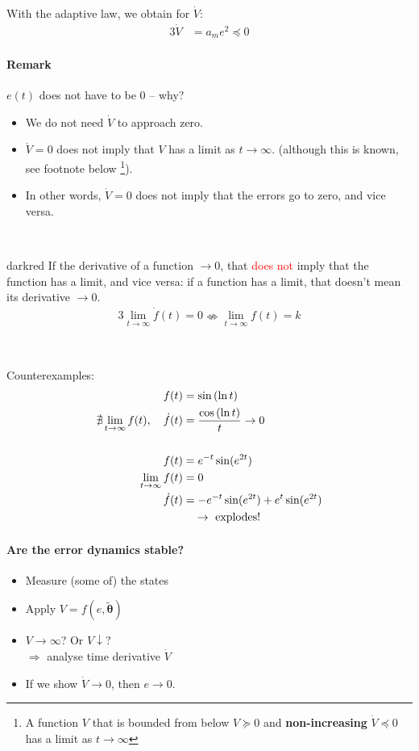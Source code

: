 With the adaptive law, we obtain for $\dot{V}$:
\begin{alignat}{3}
\dot{V} &= a_m e^2 \preceq 0 \label{eq:Vdot}
\end{alignat}

\paragraph{Remark}
$e(t)$ does not have to be 0 -- why?
\begin{itemize}
\item We do not need $\dot{V}$ to approach zero.
\item $\dot{V}=0$ does not imply that $V$ has a limit as $t \rightarrow \infty$.
    (although this is known, see footnote below%
    \footnote{A function $V$ that is bounded from below $V \succeq 0$
        and \textbf{non-increasing} $\dot{V} \preceq 0$
        has a limit as $t \rightarrow \infty$}).
\item In other words, $\dot{V}=0$ does not imply that the errors go to zero,
    and vice versa.
\end{itemize}~  

\begin{conclusion}{darkred}
If the derivative of a function $\rightarrow 0$,
that \textcolor{red}{does not} imply that the function
has a limit, and vice versa:
if a function has a limit, that doesn't mean its
derivative $\rightarrow 0$.
\begin{alignat*}{3}
\lim_{t \rightarrow \infty} \dot{f}(t) = 0
    \nLeftrightarrow \lim_{t \rightarrow \infty} f(t) = k
\end{alignat*}
\end{conclusion}~

Counterexamples:
\begin{align*}
f(t) &= \sin \left( \ln t \right)\\
\nexists \lim_{t \rightarrow \infty} f(t), \quad
\dot{f}(t) &= \frac{\cos \left( \ln t \right)}{t} \rightarrow 0\\
~\\
f(t) &= e^{-t} \sin (e^{2t})\\
 \lim_{t \rightarrow \infty} f(t) &= 0\\
\dot{f}(t) &= -e^{-t}\sin(e^{2t}) + e^t \sin(e^{2t}) \\
    & \quad \rightarrow    \textnormal{ explodes!}
\end{align*}

\paragraph{Are the error dynamics stable?}
\begin{itemize}
\item Measure (some of) the states
\item Apply $V = f(e, \tilde{\bm{\theta}})$
\item $V \rightarrow \infty$? Or $V \downarrow$?\\
    $\Rightarrow$ analyse time derivative $\dot{V}$
\item If we show $\dot{V} \rightarrow 0$, then $e \rightarrow 0$.
\end{itemize}

